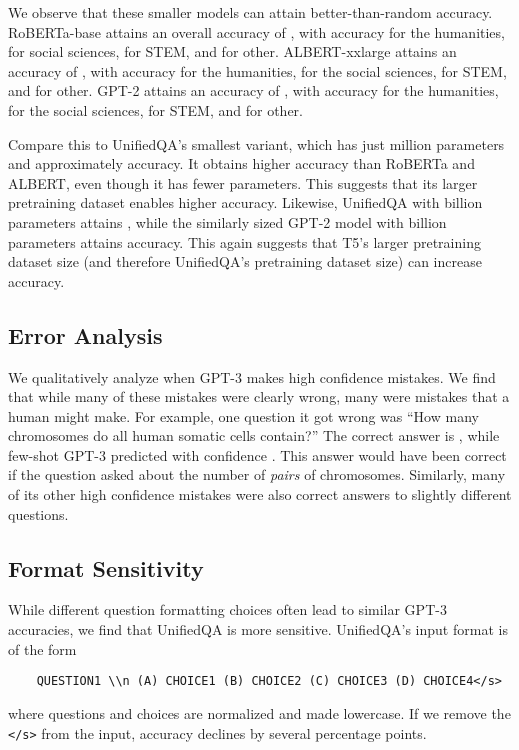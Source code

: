 \documentclass{article} \usepackage{iclr2021_conference, times}
\begin{document}
We observe that these smaller models can attain better-than-random accuracy. RoBERTa-base attains an overall accuracy of , with  accuracy for the humanities,  for social sciences,  for STEM, and  for other. ALBERT-xxlarge attains an accuracy of , with  accuracy for the humanities,  for the social sciences,  for STEM, and  for other. GPT-2 attains an accuracy of , with  accuracy for the humanities,  for the social sciences,  for STEM, and  for other.

Compare this to UnifiedQA's smallest variant, which has just  million parameters and approximately  accuracy. It obtains higher accuracy than RoBERTa and ALBERT, even though it has fewer parameters. This suggests that its larger pretraining dataset enables higher accuracy. Likewise, UnifiedQA with  billion parameters attains , while the similarly sized GPT-2 model with  billion parameters attains  accuracy. This again suggests that T5's larger pretraining dataset size (and therefore UnifiedQA's pretraining dataset size) can increase accuracy.




\subsection{Error Analysis}
We qualitatively analyze when GPT-3 makes high confidence mistakes. We find that while many of these mistakes were clearly wrong, many were mistakes that a human might make. For example, one question it got wrong was ``How many chromosomes do all human somatic cells contain?'' The correct answer is , while few-shot GPT-3 predicted  with confidence . This answer would have been correct if the question asked about the number of \emph{pairs} of chromosomes. Similarly, many of its other high confidence mistakes were also correct answers to slightly different questions.

\subsection{Format Sensitivity}
While different question formatting choices often lead to similar GPT-3 accuracies, we find that UnifiedQA is more sensitive.
UnifiedQA's input format is of the form
\begin{verbatim}
    QUESTION1 \\n (A) CHOICE1 (B) CHOICE2 (C) CHOICE3 (D) CHOICE4</s>
\end{verbatim}
where questions and choices are normalized and made lowercase.
If we remove the \texttt{</s>} from the input, accuracy declines by several percentage points.
\end{document}
